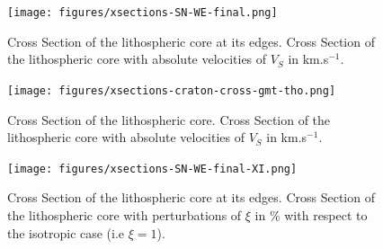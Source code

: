 \documentclass[12pt]{article}
\begin{document}


	\begin{figure}

		\centerline{\texttt{[image: figures/xsections-SN-WE-final.png]}}

		\caption{\baselineskip 18pt
		Cross Section of the lithospheric core at its edges. 
		Cross Section of the lithospheric core with absolute velocities of $V_S$ in km.s$^{-1}$.}
		\label{cratoncrossedge}

	\end{figure}

	\begin{figure}

		\centerline{\texttt{[image: figures/xsections-craton-cross-gmt-tho.png]}}

		\caption{\baselineskip 18pt
		Cross Section of the lithospheric core. 
		Cross Section of the lithospheric core with absolute velocities of $V_S$ in km.s$^{-1}$.}
		\label{cratoncrosscenter}

	\end{figure}

	\begin{figure}

		\centerline{\texttt{[image: figures/xsections-SN-WE-final-XI.png]}}

		\caption{\baselineskip 18pt
		Cross Section of the lithospheric core at its edges. 
		Cross Section of the lithospheric core with perturbations of $\xi$ in \% with respect to the isotropic case (i.e $\xi = 1$).}
		\label{cratoncrossedge-xi}

	\end{figure}



\end{document}
